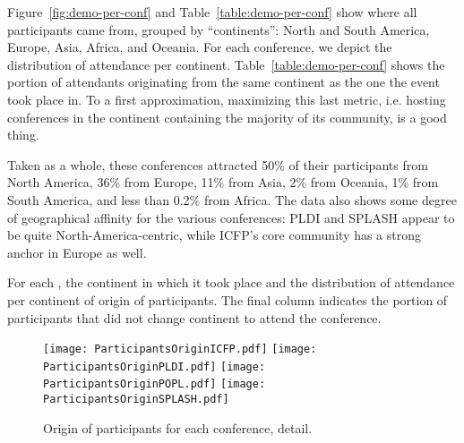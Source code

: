Figure~\ref{fig:demo-per-conf} and Table~\ref{table:demo-per-conf} show
where all participants came from, grouped by ``continents'': North and South
America, Europe, Asia, Africa, and Oceania. For each conference, we depict the
distribution of attendance per continent. Table~\ref{table:demo-per-conf}
shows the portion of attendants originating from the same continent as the
one the event took place in. To a first approximation, maximizing this last
metric, i.e. hosting conferences in the continent containing the majority of
its community, is a good thing.

Taken as a whole, these conferences attracted 50\% of their participants
from North
America, 36\% from Europe, 11\% from Asia, 2\% from Oceania, 1\% from South
America, and less than 0.2\% from Africa.
The data also shows some degree of geographical affinity for the
various conferences:
PLDI and SPLASH appear to be quite North-America-centric, while
ICFP's core community has a strong anchor in Europe as well.

\begin{table}
  \centering
  \caption{For each \event, the continent in which it took place and
    the distribution of attendance per continent of origin of participants.
    The final column indicates the
    portion of participants that did not change continent to attend the conference.}
  \label{table:demo-per-event}
\end{table}

\begin{figure}
  \centering
  \texttt{[image: ParticipantsOriginICFP.pdf]}
  \texttt{[image: ParticipantsOriginPLDI.pdf]}
  \texttt{[image: ParticipantsOriginPOPL.pdf]}
  \texttt{[image: ParticipantsOriginSPLASH.pdf]}
  \caption{Origin of participants for each conference, detail.}
  \label{fig:demo-per-event}
\end{figure}

